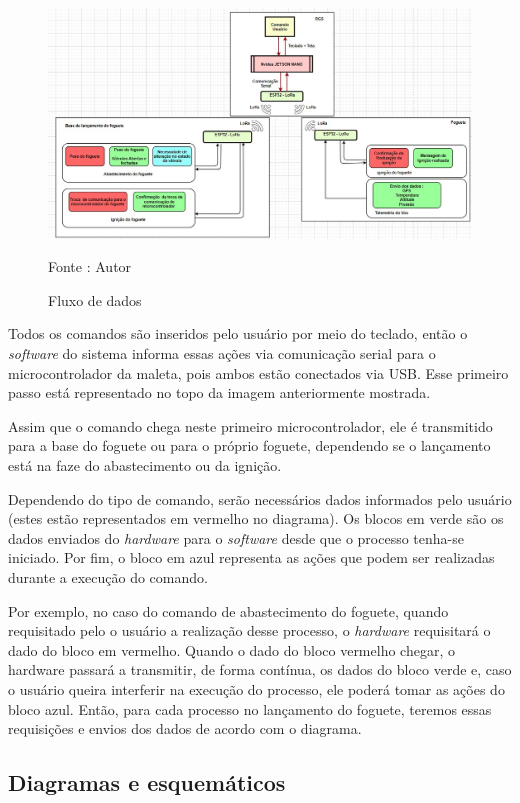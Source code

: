 \begin{figure}[H]
  \centering
  \includegraphics[scale=0.7]{figuras/Fluxo_dados.jpg}
  \caption{ Fluxo de dados} 
  {\footnotesize Fonte : Autor} 
  \label{fig:FLuxoDados}
\end{figure}

Todos os comandos são inseridos pelo usuário por meio do teclado, então o \textit{software} do sistema informa essas ações via comunicação serial para o microcontrolador da maleta, pois ambos estão conectados via USB. Esse primeiro passo está representado no topo da imagem anteriormente mostrada.

Assim que o comando chega neste primeiro microcontrolador, ele é transmitido para a base do foguete ou para o próprio foguete, dependendo se o lançamento está na faze do abastecimento ou da ignição.

Dependendo do tipo de comando, serão necessários dados informados pelo usuário (estes estão representados em vermelho no diagrama). Os blocos em verde são os dados enviados do \textit{hardware} para o \textit{software} desde que o processo tenha-se iniciado. Por fim, o bloco em azul representa as ações que podem ser realizadas durante a execução do comando.

Por exemplo, no caso do comando de abastecimento do foguete, quando requisitado pelo o usuário a realização desse processo, o \textit{hardware} requisitará o dado do bloco em vermelho. Quando o dado do bloco vermelho chegar, o hardware passará a transmitir, de forma contínua, os dados do bloco verde e, caso o usuário queira interferir na execução do processo, ele poderá tomar as ações do bloco azul. Então, para cada processo no lançamento do foguete, teremos essas requisições e envios dos dados de acordo com o diagrama.


\subsection{Diagramas e esquemáticos}


